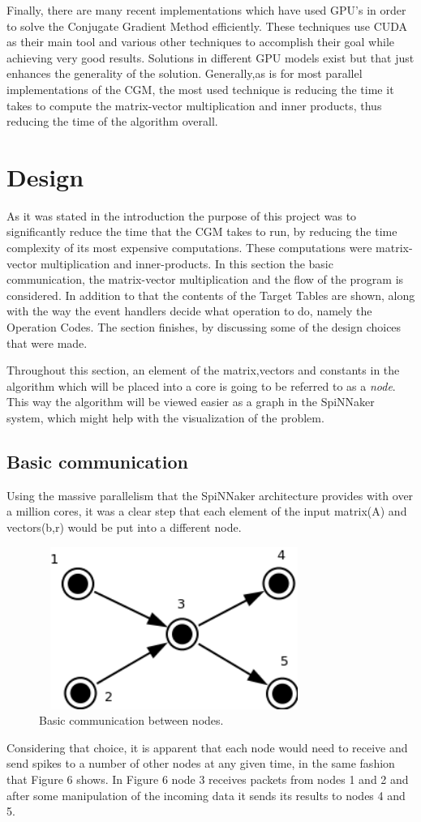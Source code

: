 \documentclass[12pt,twosided]{article}
\begin{document}
Finally, there are many recent implementations which have used GPU's in order to solve the Conjugate Gradient Method efficiently. These techniques use CUDA as their main tool and various other techniques to accomplish their goal while achieving very good results. Solutions in different GPU models exist but that just enhances the generality of the solution. Generally,as is for most parallel implementations of the CGM, the most used technique is reducing the time it takes to compute the matrix-vector multiplication and inner products, thus reducing the time of the algorithm overall\cite{galiano2012gpu}\cite{wozniak2010parallel}.
\section{Design}
As it was stated in the introduction the purpose of this project was to significantly reduce the time that the CGM takes to run, by reducing the time complexity of its most expensive computations. These computations were matrix-vector multiplication and inner-products. In this section the basic communication, the matrix-vector multiplication and the flow of the program is considered. In addition to that the contents of the Target Tables are shown, along with the way the event handlers decide what operation to do, namely the Operation Codes. The section finishes, by discussing some of the design choices that were made. 

Throughout this section, an element of the matrix,vectors and constants in the algorithm which will be placed into a core is going to be referred to as a \emph{node}. This way the algorithm will be viewed easier as a graph in the SpiNNaker system, which might help with the visualization of the problem.

\subsection{Basic communication}
Using the massive parallelism that the SpiNNaker architecture provides with over a million cores, it was a clear step that each element of the input matrix(A) and vectors(b,r) would be put into a different node. 
\begin{figure}[h!]
\includegraphics[width=250pt,height=150pt,scale=2]{Pics/basic.png}
\centering
\caption{Basic communication between nodes.}
\end{figure}
Considering that choice, it is apparent that each node would need to receive and send spikes to a number of other nodes at any given time, in the same fashion that Figure 6 shows. In Figure 6 node 3 receives packets from nodes 1 and 2 and after some manipulation of the incoming data it sends its results to nodes 4 and 5. 
\end{document}

